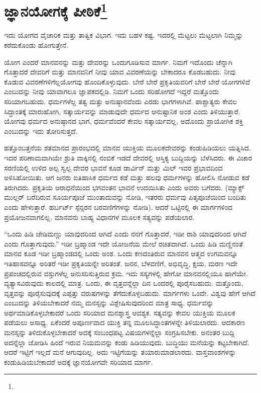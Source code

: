 
\chapter[ಜ್ಞಾನಯೋಗಕ್ಕೆ ಪೀಠಿಕೆ]{ಜ್ಞಾನಯೋಗಕ್ಕೆ ಪೀಠಿಕೆ\protect\footnote{}}

ಇದು ಯೋಗದ ವೈಚಾರಿಕ ಮತ್ತು ತಾತ್ವಿಕ ವಿಭಾಗ. ಇದು ಬಹಳ ಕಷ್ಟ. ಇದರಲ್ಲಿ ಮೆಟ್ಟಲು ಮೆಟ್ಟಲಾಗಿ ನಿಮ್ಮನ್ನು ಕರೆದುಕೊಂಡು ಹೋಗುತ್ತೇನೆ.

ಯೋಗ ಎಂದರೆ ಮಾನವನನ್ನು ಮತ್ತು ದೇವರನ್ನು ಒಂದುಗೂಡಿಸುವ ಮಾರ್ಗ. ನಿಮಗೆ ಇದೊಂದು ಚೆನ್ನಾಗಿ ಗೊತ್ತಾದರೆ ದೇವರಿಗೆ ಮತ್ತು ಮಾನವನಿಗೆ ನೀವು ಯಾವ ವಿವರಣೆಯನ್ನು ಬೇಕಾದರೂ ಕೊಡಬಹುದು. ನೀವು ಕೊಡುವ ವಿವರಣೆಗಳಿಗೆಲ್ಲ\break ಯೋಗವು ಹೊಂದಿಕೊಳ್ಳುವುದು. ಬೇರೆ ಬೇರೆ ಪ್ರಕೃತಿಯವರಿಗೆ ಬೇರೆ ಬೇರೆ ಯೋಗಗಳಿವೆ ಎಂಬುದನ್ನು ನೀವು ಯಾವಾಗಲೂ ಜ್ಞಾಪಕದಲ್ಲಿಡಿ. ನಿಮಗೆ ಒಂದು ಸರಿಹೋಗದೆ ಇದ್ದರೆ ಮತ್ತೊಂದು ಸರಿಯಾಗಬಹುದು. ಧರ್ಮಗಳೆಲ್ಲ ತತ್ವ ಮತ್ತು ಅನುಷ್ಠಾನವೆಂದು ಎರಡು ಭಾಗಗಳಾಗಿವೆ. ಪಾಶ್ಚಾತ್ಯರು ಕೇವಲ ಸಿದ್ಧಾಂತಕ್ಕೆ ಮಾರುಹೋಗಿ, ಸತ್ಕಾರ್ಯವನ್ನು ಮಾಡುವುದೇ ಧರ್ಮದ ಆನುಷ್ಟಾನಿಕ ಅಂಶ ಎಂದು ತಿಳಿಯುತ್ತಾರೆ. ಯೋಗವು ಧರ್ಮದ ಅನುಷ್ಠಾನದ ಭಾಗ, ಧರ್ಮವೆಂದರೆ ಕೇವಲ ಸತ್ಕಾರ್ಯವಲ್ಲ, ಅದೊಂದು ಪ್ರಾಯೋಗಿಕ ಶಕ್ತಿ ಎಂಬುದನ್ನು ಇದು ತೋರಿಸುತ್ತದೆ.

ಹತ್ತೊಂಬತ್ತನೆಯ ಶತಮಾನದ ಪ್ರಾರಂಭದಲ್ಲಿ ಮಾನವ ಯುಕ್ತಿಯ ಮೂಲಕ\break ದೇವರನ್ನು ಕಂಡುಹಿಡಿಯಲು ಯತ್ನಿಸಿದ. ಇದರ ಪರಿಣಾಮವಾಗಿಯೇ ಶ್ರುತಿ ವಾಕ್ಕಿನಲ್ಲಿ ನಂಬಿಕೆ ಇಡದೆ ದೇವರಲ್ಲಿ ಆಸ್ತಿಕ್ಯ ಬುದ್ದಿಯನ್ನು ಬೆಳೆಸಿದರು. ಈ ವಿಚಾರ ಸರಣಿಯಲ್ಲಿ ಉಳಿದ ಅಲ್ಪ ಸ್ವಲ್ಪ ದೇವರ ಭಾವನೆ ಕೂಡ ಡಾರ್ವಿನ್ ಮತ್ತು ಮಿಲ್ ಇವರ ಪ್ರಭಾವದಿಂದ ಅಳಿಸಿಹೋಯಿತು. ಆಗ ಜನರು ಐತಿಹಾಸಿಕ ಧರ್ಮದ ಕಡೆ ಮತ್ತು ಹಲವು ಧರ್ಮಗಳನ್ನು ಹೋಲಿಸಿ ನೋಡುವ ಕಡೆ ತಿರುಗಿದರು. ಪ್ರಕೃತಿಯ ಆರಾಧನೆಯಿಂದ ಭಗವಂತನ ಭಾವನೆ ಉದಯಿಸಿತು ಎಂದು ಅವರು ಬಗೆದರು. (ಮ್ಯಾಕ್ಸ್ ಮುಲ್ಲರ್ ಬರೆದಿರುವ ಸೂರ್ಯಪೂಜೆ ಮುಂತಾದುವನ್ನು ನೋಡಿ, ಇತರರು ಧರ್ಮವು ಪಿತೃಪೂಜೆಯಿಂದ ಬಂದಿತು ಎಂದು ಹೇಳುತ್ತಾರೆ. ಹರ್ಬರ್ಟ್ ಸ್ಪೆನ್ಸರನ ಬರವಣಿಗೆಗಳನ್ನು ನೋಡಿ). ಆದರೆ ಒಟ್ಟಿನಲ್ಲಿ ಈ ಮಾರ್ಗಗಳಿಂದ ಪ್ರಯೋಜನವಾಗಲಿಲ್ಲ. ಮಾನವನು ಬಾಹ್ಯ ವಿಧಾನಗಳ ಮೂಲಕ ಸತ್ಯವನ್ನು ಪಡೆಯಲಾರ.

“ಒಂದು ಹಿಡಿ ಜೇಡಿಮಣ್ಣು ಯಾವುದರಿಂದ ಆಗಿದೆ ಎಂದು ನನಗೆ ಗೊತ್ತಾದರೆ, ಇಡೀ ರಾಶಿ ಯಾವುದರಿಂದ ಆಗಿದೆ ಎಂದು ಗೊತ್ತಾಗುವುದು.” ಇಡೀ ಬ್ರಹ್ಮಾಂಡ ಇದೇ ಯೋಜನೆಯ ಮೇಲೆ ರಚಿತವಾಗಿದೆ. ಒಂದು ಹಿಡಿ ಮಣ್ಣಿನಂತೆ ಮಾನವ ಕೂಡ ಇಡೀ ಬ್ರಹ್ಮಾಂಡದಲ್ಲಿ ಒಂದು ಅಂಶ. ಒಂದು ಕಣದಂತಿರುವ ಮಾನವನ ಆತ್ಮದ ಉಗಮವನ್ನೂ ಇತಿಹಾಸವನ್ನೂ ಅರಿತರೆ ಇಡೀ ಪ್ರಕೃತಿಯನ್ನೇ ಅರಿತಂತೆ. ಜನನ, ಬೆಳವಣಿಗೆ, ಅಭಿವೃದ್ಧಿ, ಕ್ಷಯ, ಮರಣ ಇದೇ ಪ್ರಪಂಚದಲ್ಲಿರುವ ವಸ್ತುಗಳೆಲ್ಲ ಅನುಸರಿಸುತ್ತಿರುವ ಕ್ರಮ. ಇದು ಸಸ್ಯಗಳಲ್ಲಿ ಹೇಗೋ ಮಾನವನಲ್ಲಿಯೂ ಹಾಗೆಯೇ. ವ್ಯತ್ಯಾಸವಿರುವುದು ಕಾಲದಲ್ಲಿ ಮಾತ್ರ. ಒಂದು, ಈ ವೃತ್ತವನ್ನೆಲ್ಲಾ ದಿನ ಒಂದರಲ್ಲಿ ಪೂರೈಸಬಹುದು. ಮತ್ತೊಂದು, ವೃತ್ತವನ್ನು ಪೂರೈಸುವುದಕ್ಕೆ ಎಪ್ಪತ್ತು ವರುಷಗಳನ್ನು ತೆಗೆದುಕೊಳ್ಳಬಹುದು. ಮಾರ್ಗಗಳು ಒಂದೇ. ವಿಶ್ವವು ಹೇಗೆ ಆಗಿದೆ ಎಂಬುದನ್ನು ತಿಳಿಯಬೇಕಾದರೆ ನಮ್ಮ ಮನಸ್ಸನ್ನು ವಿಶ್ಲೇಷಿಸುವುದರಿಂದ ಮಾತ್ರ ಸಾಧ್ಯ. ಧರ್ಮವನ್ನು ಅರ್ಥಮಾಡಿಕೊಳ್ಳಬೇಕಾದರೆ ಒಂದು ಸರಿಯಾದ ಮನಶ್ಶಾಸ್ತ್ರ ಆವಶ್ಯಕ. ಸತ್ಯವನ್ನು ಕೇವಲ ಯುಕ್ತಿಯ ಮೂಲಕ ಪಡೆಯಲು ಅಸಾಧ್ಯ. ಏಕೆಂದರೆ ಅಪೂರ್ಣವಾದ ಯುಕ್ತಿ ತನ್ನ ಮೂಲಸಿದ್ಧಾಂತಗಳನ್ನೇ ತಿಳಿಯಲಾರದು. ಆದಕಾರಣ ಮನಸ್ಸನ್ನು ತಿಳಿದುಕೊಳ್ಳಬೇಕಾದರೆ ಅದಕ್ಕೆ ಸಂಬಂಧಪಟ್ಟ ವಿಷಯಗಳನ್ನೆಲ್ಲಾ ಸಂಗ್ರಹಿಸಬೇಕು. ಅನಂತರ ಬುದ್ದಿ ಅದನ್ನೆಲ್ಲಾ ಜೋಡಿಸಿ ಹಿಂದೆ ಇರುವ ನಿಯಮವನ್ನು ಕಂಡು ಹಿಡಿಯುವುದು. ಬುದ್ಧಿಯು ಮನೆಯನ್ನು ಕಟ್ಟಬೇಕಾಗಿದೆ. ಆದರೆ ಇಟ್ಟಿಗೆ ಇಲ್ಲದೆ ಮನೆ ಆಗುವುದಿಲ್ಲ. ಅದು ಇಟ್ಟಿಗೆಯನ್ನು ತಯಾರುಮಾಡಲಾರದು. ವಾಸ್ತವಾಂಶಗಳನ್ನು ಕಂಡುಹಿಡಿಯಬೇಕಾದರೆ ಅದಕ್ಕೆ ಜ್ಞಾನಯೋಗವೇ ಸರಿಯಾದ ಮಾರ್ಗ.


